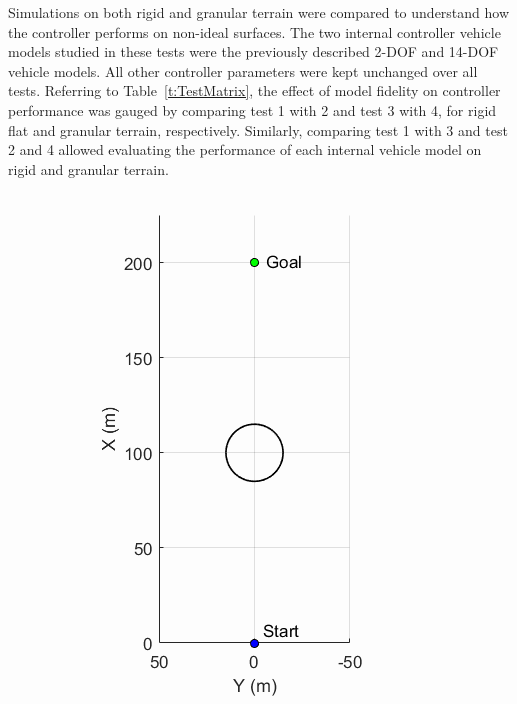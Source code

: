 \documentclass[12pt,twocolumn]{article}
\begin{document}
Simulations on both rigid and granular terrain were compared to understand how the controller performs on non-ideal surfaces.  The two internal controller vehicle models studied in these tests were the previously described 2-DOF and 14-DOF vehicle models. All other controller parameters were kept unchanged over all tests. Referring to Table~\ref{t:TestMatrix}, the effect of model fidelity on controller performance was gauged by comparing test 1 with 2 and test 3 with 4, for rigid flat and granular terrain, respectively.
Similarly, comparing test 1 with 3 and test 2 and 4 allowed evaluating the performance of each internal vehicle model on rigid and granular terrain.

\begin{figure}
	\centering
	\begin{subfigure}[b]{0.49\columnwidth}
		\centering
		\includegraphics[width=\textwidth]{Figs/ObstacleField1.png}

\end{subfigure}
\end{figure}
\end{document}
